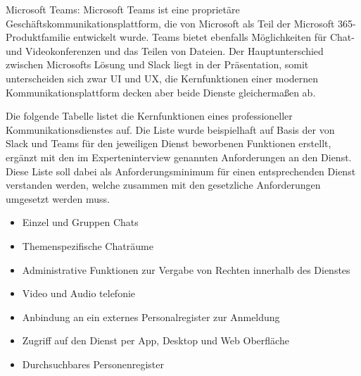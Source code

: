 Microsoft Teams: Microsoft Teams ist eine proprietäre Geschäftskommunikationsplattform, die von Microsoft als Teil der Microsoft 365-Produktfamilie entwickelt wurde. Teams bietet ebenfalls Möglichkeiten für Chat- und Videokonferenzen und das Teilen von Dateien. Der Hauptunterschied zwischen Microsofts Lösung und Slack liegt in der Präsentation, somit unterscheiden sich zwar UI und UX, die Kernfunktionen einer modernen Kommunikationsplattform decken aber beide Dienste gleichermaßen ab.

Die folgende Tabelle listet die Kernfunktionen eines professioneller Kommunikationsdienstes auf. Die Liste wurde beispielhaft auf Basis der von Slack und Teams für den jeweiligen Dienst beworbenen Funktionen erstellt, ergänzt mit den im Experteninterview genannten Anforderungen an den Dienst. Diese Liste soll dabei als Anforderungsminimum für einen entsprechenden Dienst verstanden werden, welche zusammen mit den gesetzliche Anforderungen umgesetzt werden muss.

\begin{itemize}
    \item Einzel und Gruppen Chats 
    \item Themenspezifische Chaträume
    \item Administrative Funktionen zur Vergabe von Rechten innerhalb des Dienstes 
    \item Video und Audio telefonie
    \item Anbindung an ein externes Personalregister zur Anmeldung
    \item Zugriff auf den Dienst per App, Desktop und Web Oberfläche
    \item Durchsuchbares Personenregister
\end{itemize}